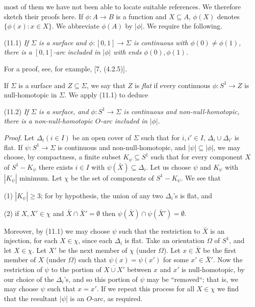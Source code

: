 \noindent most of them we have not been able to locate suitable references. We therefore sketch their proofs here. If $\phi \colon A \to B$ is a function and $X \subseteq A$, $\phi(X)$ denotes $\{\phi(x) \colon x \in X\}$. We abbreviate $\phi(A)$ by $|\phi|$. We require the following.

\stmt
(11.1) \textit{If $\Sigma$ is a surface and $\phi \colon [0, 1] \to \Sigma$ is continuous with $\phi(0) \ne \phi(1)$, there is a $[0, 1]$-arc included in $|\phi|$ with ends $\phi(0), \phi(1)$.}

For a proof, see, for example, [7, (4.2.5)].

If $\Sigma$ is a surface and $Z \subseteq \Sigma$, we say that $Z$ is \textit{flat} if every continuous $\phi \colon S^1 \to Z$ is null-homotopic in $\Sigma$. We apply (11.1) to deduce

\stmt
(11.2) \textit{If $\Sigma$ is a surface, and $\phi \colon S^1 \to \Sigma$ is continuous and non-null-homotopic, there is a non-null-homotopic $O$-arc included in $|\phi|$.}

\textit{Proof.} Let $\Delta_i (i \in I)$ be an open cover of $\Sigma$ such that for $i, i' \in I$, $\Delta_i \cup \Delta_{i'}$ is flat. If $\psi \colon S^1 \to \Sigma$ is continuous and non-null-homotopic, and $|\psi| \subseteq |\phi|$, we may choose, by compactness, a finite subset $K_\psi \subseteq S^1$ such that for every component $X$ of $S^1 - K_\psi$ there exists $i \in I$ with $\psi(\bar{X}) \subseteq \Delta_i$. Let us choose $\psi$ and $K_\psi$ with $|K_\psi|$ minimum. Let $\chi$ be the set of components of $S^1 - K_\psi$. We see that

\hspace*{12pt}(1) $|K_\psi| \ge 3$; for by hypothesis, the union of any two $\Delta_i$'s is flat, and

\hspace*{12pt}(2) if $X, X' \in \chi$ and $\bar{X} \cap \bar{X}' = \emptyset$ then $\psi(\bar{X}) \cap \psi(\bar{X}') = \emptyset$.

Moreover, by (11.1) we may choose $\psi$ such that the restriction to $\bar{X}$ is an injection, for each $X \in \chi$, since each $\Delta_i$ is flat. Take an orientation $\Omega$ of $S^1$, and let $X \in \chi$. Let $X'$ be the next member of $\chi$ (under $\Omega$). Let $x \in \bar{X}$ be the first member of $X$ (under $\Omega$) such that $\psi(x) = \psi(x')$ for some $x' \in \bar{X}'$. Now the restriction of $\psi$ to the portion of $\overline{X \cup X'}$ between $x$ and $x'$ is null-homotopic, by our choice of the $\Delta_i$'s, and so this portion of $\psi$ may be ``removed``; that is, we may choose $\psi$ such that $x = x'$. If we repeat this process for all $X \in \chi$ we find that the resultant $|\psi|$ is an $O$-arc, as required.

